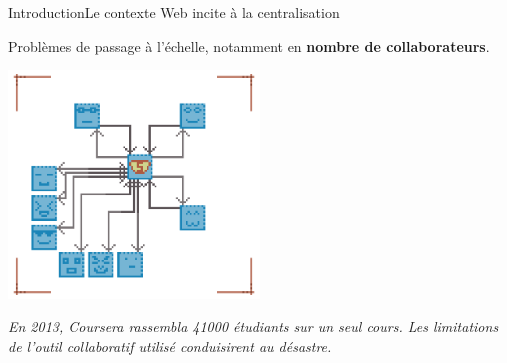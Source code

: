 \begin{frame}{Introduction}{Le contexte Web incite à la centralisation}
  

  Problèmes de passage à l'échelle, notamment en \textbf{nombre de
    collaborateurs}.
  
  \vspace{0.5cm}
  
  \begin{center}
    \includegraphics[width=0.5\textwidth]{img/centralizedcpuproblems.png}
  \end{center}
  
  \vspace{0.25cm}

  \textit{En 2013, Coursera rassembla 41000 étudiants sur un seul cours.  Les
    limitations de l'outil collaboratif utilisé conduisirent au \og
    désastre\fg{}.}

  \vspace{0.25cm}




\end{frame}
